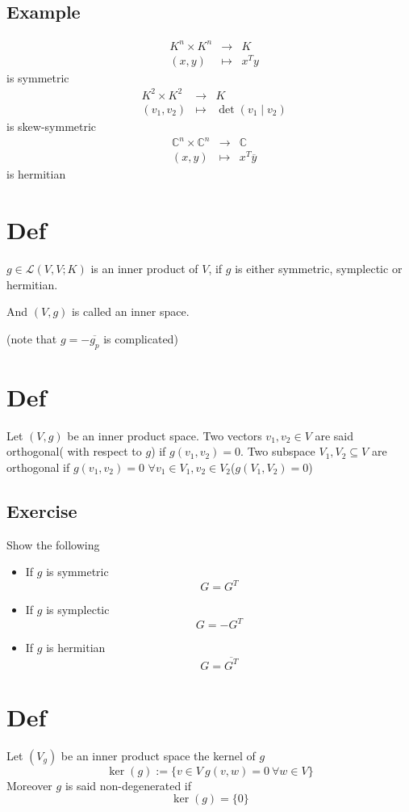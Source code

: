 \documentclass{book}
\begin{document}
\subsection{Example}
$$\begin{aligned}
    &K^n\times K^n&\rightarrow&K\\ &(x,y)&\mapsto &x^Ty
\end{aligned}$$
is symmetric
$$\begin{aligned}
    &K^2\times K^2&\rightarrow&K\\ &(v_1,v_2)&\mapsto &\det(v_1\mid v_2)
\end{aligned}$$ is skew-symmetric
$$\begin{aligned}
    &\mathbb{C}^n\times\mathbb{C}^n&\rightarrow&\mathbb{C}\\ &(x,y)&\mapsto &x^T\overline y
\end{aligned}$$
is hermitian
\section{Def}
$g\in \mathscr{L}(V,V;K)$ is an inner product of $V$, if $g$ is either symmetric, symplectic or hermitian.

And $(V,g)$ is called an inner space.

(note that $g=-\overline{g_p}$ is complicated)
\section{Def}
Let $(V,g)$ be an inner product space. Two vectors $v_1,v_2\in V$ are said orthogonal( with respect to $g$) if $g(v_1,v_2)=0$. Two subspace $V_1,V_2\subseteq V$ are orthogonal if $g(v_1,v_2)=0$  $\forall v_1\in V_1,v_2\in V_2$($g(V_1,V_2)=0$)
\subsection*{Exercise}
Show the following
\begin{itemize}
    \item If $g$ is symmetric $$G=G^T$$
    \item If $g$ is symplectic $$G=-G^T$$
    \item If $g$ is hermitian $$G=\overline{G^T}$$
\end{itemize}
\section{Def}
Let $(V_g)$ be an inner product space the kernel of $g$
$$\ker(g):=\{v\in V\ g(v,w)=0\ \forall w\in V\}$$
Moreover $g$ is said non-degenerated if
$$\ker(g)=\{0\}$$
\end{document}
